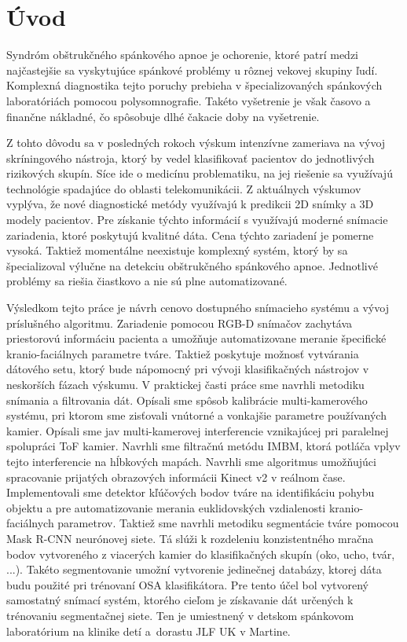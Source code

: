 
\setcounter{page}{1} %
\chapter{Úvod} \label{kap:Uvod}

\pagestyle{fancy}
\fancyhf{}
\fancyfoot[CE,CO]{\thepage}
\renewcommand{\footrulewidth}{1pt}


Syndróm obštrukčného spánkového apnoe je ochorenie, ktoré patrí medzi najčastejšie sa
vyskytujúce spánkové problémy u rôznej vekovej skupiny ľudí. Komplexná diagnostika tejto poruchy prebieha v špecializovaných spánkových laboratóriách pomocou polysomnografie. Takéto vyšetrenie je však časovo a finančne nákladné, čo spôsobuje dlhé čakacie doby na vyšetrenie.

Z tohto dôvodu sa v posledných rokoch výskum intenzívne zameriava na vývoj skríningového nástroja, ktorý by vedel klasifikovať pacientov do jednotlivých rizikových skupín. Síce ide o medicínu problematiku, na jej riešenie sa využívajú technológie spadajúce do oblasti telekomunikácii. Z aktuálnych výskumov vyplýva, že nové diagnostické metódy využívajú k predikcii 2D snímky a 3D modely pacientov.  
Pre získanie týchto informácií s využívajú moderné snímacie zariadenia, ktoré poskytujú kvalitné dáta. Cena týchto zariadení je pomerne vysoká. Taktiež momentálne neexistuje komplexný systém, ktorý by sa špecializoval výlučne na detekciu obštrukčného spánkového apnoe. Jednotlivé problémy sa riešia čiastkovo a nie sú plne automatizované.     

Výsledkom tejto práce je návrh cenovo dostupného snímacieho systému a vývoj príslušného algoritmu. Zariadenie pomocou RGB-D snímačov zachytáva priestorovú informáciu pacienta a umožňuje automatizovane meranie špecifické kranio-faciálnych parametre tváre. Taktiež poskytuje možnosť vytvárania dátového setu, ktorý bude nápomocný pri vývoji klasifikačných nástrojov v neskorších fázach výskumu. 
\newpage
V praktickej časti práce sme navrhli metodiku snímania a filtrovania dát. Opísali sme spôsob kalibrácie multi-kamerového systému, pri ktorom sme zisťovali vnútorné a vonkajšie parametre používaných kamier. Opísali sme jav multi-kamerovej interferencie vznikajúcej pri paralelnej spolupráci ToF kamier. Navrhli sme filtračnú metódu IMBM, ktorá potláča vplyv tejto interferencie na hĺbkových mapách. Navrhli sme algoritmus umožňujúci spracovanie prijatých obrazových informácii Kinect v2 v reálnom čase. Implementovali sme detektor kľúčových bodov tváre na identifikáciu pohybu objektu a pre automatizovanie merania euklidovských vzdialenosti kranio-faciálnych parametrov. Taktiež sme navrhli metodiku segmentácie tváre pomocou Mask R-CNN neurónovej siete. Tá slúži k rozdeleniu konzistentného mračna bodov vytvoreného z viacerých kamier do klasifikačných skupín (oko, ucho, tvár, ...). Takéto segmentovanie umožní vytvorenie jedinečnej databázy, ktorej dáta budu použité pri trénovaní OSA klasifikátora. Pre tento účel bol vytvorený samostatný snímací systém, ktorého cieľom je získavanie dát určených k trénovaniu segmentačnej siete. Ten je umiestnený v detskom spánkovom laboratórium na klinike detí a dorastu JLF UK v Martine. 


